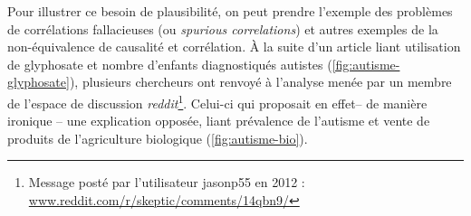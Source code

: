 Pour illustrer ce besoin de \og plausibilité\fg{}, on peut prendre l'exemple des problèmes de corrélations fallacieuses (ou \og \textit{spurious correlations}\fg{}) et autres exemples de la non-équivalence de causalité et corrélation.
À la suite d'un article \autocite{shaw_elevated_2017} liant utilisation de glyphosate et nombre d'enfants diagnostiqués autistes (\cref{fig:autisme-glyphosate}), plusieurs chercheurs ont renvoyé à l'analyse menée par un membre de l'espace de discussion \textit{reddit}\footnote{
	Message posté par l'utilisateur \og jasonp55\fg{} en 2012 : \\ \href{https://www.reddit.com/r/skeptic/comments/14qbn9/rskeptic_i_was_practicing_graphpad_and_i_think_i/}{www.reddit.com/r/skeptic/comments/14qbn9/}
}.
Celui-ci qui proposait en effet-- de manière ironique -- une explication opposée, liant prévalence de l'autisme et vente de produits de  l'agriculture biologique (\cref{fig:autisme-bio}).

